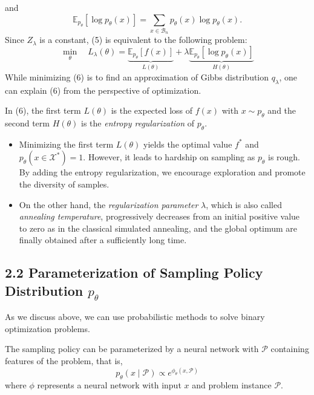 and
\begin{equation}
    \mathbb{E}_{p_\theta}\left[\log p_\theta(x)\right] = \sum_{x \in \mathcal{B}_n} p_\theta(x) \log p_\theta(x).
\end{equation}
Since $Z_{\lambda}$ is a constant, (5) is equivalent to the following problem:
\begin{equation}
    \min _{\theta} \quad L_{\lambda}(\theta)=\underbrace{\mathbb{E}_{p_{\theta}}[f(x)]}_{L(\theta)}+\lambda \underbrace{\mathbb{E}_{p_{\theta}}\left[\log p_{\theta}(x)\right]}_{H(\theta)} \tag{6}
\end{equation}
While minimizing (6) is to find an approximation of Gibbs distribution $q_{\lambda}$, one can explain (6) from the perspective of optimization. 

In (6), the first term $L(\theta)$ is the expected loss of $f(x)$ with $x \sim p_{\theta}$ and the second term $H(\theta)$ is the \textit{entropy regularization} of $p_{\theta}$. 
\begin{itemize}
    \item Minimizing the first term $L(\theta)$ yields the optimal value $f^{*}$ and $p_{\theta}\left(x \in \mathcal{X}^{*}\right)=1$. However, it leads to hardship on sampling as $p_{\theta}$ is rough. By adding the entropy regularization, we encourage exploration and promote the diversity of samples.
    \item On the other hand, the\textit{ regularization parameter} $\lambda$, which is also called \textit{annealing temperature}, progressively decreases from an initial positive value to zero as in the classical simulated annealing, and the global optimum are finally obtained after a sufficiently long time.
\end{itemize}

\subsection{2.2 Parameterization of Sampling Policy Distribution $p_{\theta}$}

As we discuss above, we can use probabilistic methods to solve binary optimization problems. 

The sampling policy can be parameterized by a neural network with $\mathcal{P}$ containing features of the problem, that is,
\begin{equation}
    p_{\theta}(x \mid \mathcal{P}) \propto e^{\phi_{\theta}(x, \mathcal{P})} \tag{7}
\end{equation}
where $\phi$ represents a neural network with input $x$ and problem instance $\mathcal{P}$. 

